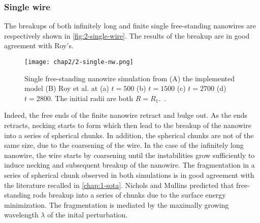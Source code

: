     \subsubsection{Single wire}
    The breakups of both infinitely long and finite single free-standing nanowires are respectively shown in \autoref{fig:2-single-wire}. The results of the breakup are in good agreement with Roy's. 
    \begin{figure}[H]
        \centering
        \texttt{[image: chap2/2-single-nw.png]}
        \caption{Single free-standing nanowire simulation from (A) the implemented model (B) Roy et al. at (a) $t=500$ (b) $t=1500$ (c) $t=2700$ (d) $t=2800$. The initial radii are both $R=R_1$.\ \cite{RoyVarmaGururajan2021}.}
        \label{fig:2-single-wire}
    \end{figure}
    Indeed, the free ends of the finite nanowire retract and bulge out. As the ends retracts, necking starts to form which then lead to the breakup of the nanowire into a series of spherical chunks. In addition, the spherical chunks are not of the same size, due to the coarsening of the wire. In the case of the infinitely long nanowire, the wire starts by coarsening until the instabilities grow sufficiently to induce necking and subsequent breakup of the nanowire.
    The fragmentation in a series of spherical chunk observed in both simulations is in good agreement with the literature recalled in \autoref{chap:1-sota}. Nichols and Mullins predicted that free-standing rods breakup into a series of chunks due to the surface energy minimization. The fragmentation is mediated by the maximally growing wavelength $\lambda$ of the inital perturbation.
